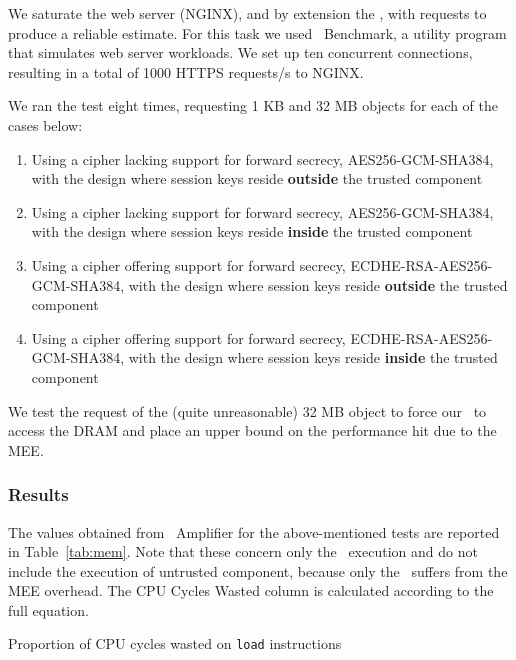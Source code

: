 \documentclass[../../../main.tex]{subfiles}
\begin{document}
We saturate the web server (NGINX), and by extension the \enclavemodel, with
requests to produce a reliable estimate. For this task we used
\Apache~Benchmark, a utility program that simulates web server workloads. We
set up ten concurrent connections, resulting in a total of 1000 HTTPS
requests/s to NGINX.

We ran the test eight times, requesting 1 KB and 32 MB objects for each of the
cases below:
\begin{enumerate}
  \item Using a cipher lacking support for forward secrecy,
    AES256-GCM-SHA384, with the design where session keys reside
    \textbf{outside} the trusted component
  \item Using a cipher lacking support for forward secrecy,
    AES256-GCM-SHA384, with the design where session keys reside
    \textbf{inside} the trusted component
  \item Using a cipher offering support for forward secrecy,
    ECDHE-RSA-AES256-GCM-SHA384, with the design where session keys reside
    \textbf{outside} the trusted component
  \item Using a cipher offering support for forward secrecy,
    ECDHE-RSA-AES256-GCM-SHA384, with the design where session keys reside
    \textbf{inside} the trusted component
\end{enumerate}

We test the request of the (quite unreasonable) 32 MB object to force
our \enclavemodel~to access the DRAM and place an upper bound on the
performance hit due to the MEE.

\subsubsection*{Results}
The values obtained from \VTune~Amplifier for the above-mentioned
tests are reported in Table~\ref{tab:mem}. Note that these concern
only the \enclavemodel~execution and do not include the execution of
untrusted component, because only the \enclaveprogram~suffers from the
MEE overhead. The CPU Cycles Wasted column is calculated according to
the full equation.

\begin{table}[H]
  \caption{Proportion of CPU cycles wasted on \texttt{load}
    instructions}
  \label{tab:mem}
\end{table}
\end{document}
